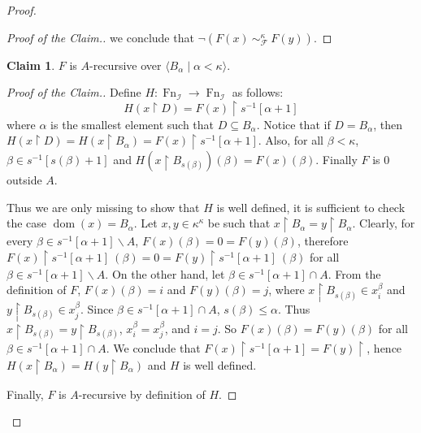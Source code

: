 \documentclass{amsart}
\numberwithin{equation}{section}
\newcommand{\I}{\mathcal{I}}
\newcommand{\seq}[2]{\langle #1 \mid #2 \rangle}
\newcommand{\1}{\mathbf{I}}
\newcommand{\2}{\mathbf{II}}
\DeclareMathOperator{\dom}{dom}
\DeclareMathOperator{\Fn}{Fn}
\theoremstyle{definition}
\newtheorem{claim}{Claim}[theorem]
\theoremstyle{remark}
\begin{document}
\begin{proof}
\begin{proof}[Proof of the Claim.]
        we conclude that $\neg(F(x)\ \sim^\kappa_\mathcal{F}\ F(y))$.
    \end{proof}
    \begin{claim}
        $F$ is $A$-recursive over $\seq{B_\alpha}{\alpha<\kappa}$.
    \end{claim}
    \begin{proof}[Proof of the Claim.]
    Define $H:\Fn_{\I}\rightarrow \Fn_{\I}$ as follows:
        $$H(x\restriction D)=F(x)\restriction s^{-1}[\alpha+1]$$%
    where $\alpha$ is the smallest element such that $D\subseteq B_\alpha$.
    Notice that if $D=B_\alpha$, then $H(x\restriction D)=H(x\restriction B_\alpha)= F(x)\restriction s^{-1}[\alpha+1]$. Also, for all $\beta<\kappa$, $\beta\in s^{-1}[s(\beta)+1]$ and $H(x\restriction B_{s(\beta)})(\beta)=F(x)(\beta)$. Finally $F$ is 0 outside $A$. 

   Thus we are only missing to show that $H$ is well defined, it is sufficient to check the case $\dom(x)=B_\alpha$. Let $x,y\in \kappa^{\kappa}$ be such that $x\restriction B_\alpha=y\restriction B_\alpha$. 
    Clearly, for every $\beta\in s^{-1}[\alpha+1]\backslash A$, $F(x)(\beta)=0=F(y)(\beta)$, therefore $F(x)\restriction s^{-1}[\alpha+1]\ (\beta)=0=F(y)\restriction s^{-1}[\alpha+1]\ (\beta)$ for all $\beta\in s^{-1}[\alpha+1]\backslash A$.
    On the other hand, let $\beta\in s^{-1}[\alpha+1]\cap A$. From the definition of $F$, $F(x)(\beta)=i$ and $F(y)(\beta)=j$, where $x\restriction B_{s(\beta)}\in x_i^\beta$ and $y\restriction B_{s(\beta)}\in x_j^\beta$. Since $\beta\in s^{-1}[\alpha+1]\cap A$, $s(\beta)\leq \alpha$. Thus $x\restriction B_{s(\beta)}=y\restriction B_{s(\beta)}$, $x_i^\beta=x_j^\beta$, and $i=j$. 
    So $F(x) (\beta)=F(y) (\beta)$ for all $\beta\in s^{-1}[\alpha+1]\cap A$. We conclude that $F(x)\restriction s^{-1}[\alpha+1] =F(y)\restriction $, hence $H(x\restriction B_\alpha)=H(y\restriction B_\alpha)$ and $H$ is well defined.

   Finally, $F$ is $A$-recursive by definition of \(H\). 
    \end{proof}
    

\end{proof}
\end{document}
